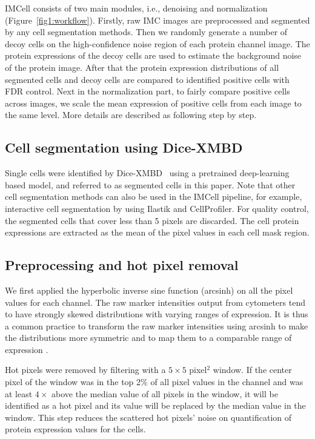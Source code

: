 \documentclass{mynature}
\begin{document}
IMCell consists of two main modules, i.e., denoising and normalization (Figure~\ref{fig1:workflow}). Firstly, raw IMC images are preprocessed and segmented by any cell segmentation methods. Then we randomly generate a number of decoy cells on the high-confidence noise region of each protein channel image. The protein expressions of the decoy cells are used to estimate the background noise of the protein image. 
After that the protein expression distributions of all segmented cells and decoy cells are compared to identified positive cells with FDR control. 
Next in the normalization part, to fairly compare positive cells across images, we scale the mean expression of positive cells from each image to the same level. More details are described as following step by step. 


\subsection{Cell segmentation using Dice-XMBD}

Single cells were identified by Dice-XMBD~\cite{dice-xmbd} using a pretrained deep-learning based model, and referred to as segmented cells in this paper. 
Note that other cell segmentation methods can also be used in the IMCell pipeline, for example, interactive cell segmentation by using Ilastik and CellProfiler. 
For quality control, the segmented cells that cover less than 5 pixels are discarded. 
The cell protein expressions are extracted as the mean of the pixel values in each cell mask region.

\subsection{Preprocessing and hot pixel removal}

We first applied the hyperbolic inverse sine function (arcsinh) on all the pixel values for each channel. 
The raw marker intensities output from cytometers tend to have strongly skewed distributions with varying ranges of expression. 
It is thus a common practice to transform the raw marker intensities using arcsinh to make the distributions more symmetric and to map them to a comparable range of expression \cite{bendall2011single, bruggner2014automated}. 

Hot pixels were removed by filtering with a $5\times 5$ pixel$^{2}$ window. 
If the center pixel of the window was in the top 2\% of all pixel values in the channel and was at least $4\times$ above the median value of all pixels in the window, it will be identified as a hot pixel and its value will be replaced by the median value in the window. 
This step reduces the scattered hot pixels' noise on quantification of protein expression values for the cells. 
\end{document}
